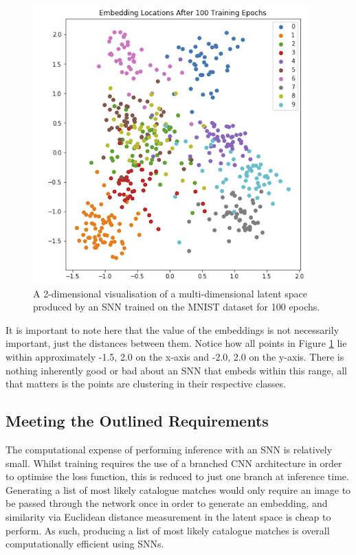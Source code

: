 \begin{figure}
	\begin{center}
		\includegraphics[scale=0.5]{Chapter6/figs/mnist-class-clusters-PCA.png}
	\end{center}
	\caption[A 2-dimensional visualisation of a multi-dimensional latent space produced by an SNN trained on the MNIST dataset for 100 epochs.]{A 2-dimensional visualisation of a multi-dimensional latent space produced by an SNN trained on the MNIST dataset \cite{lecun_gradient-based_1998} for 100 epochs.}
	\label{fig:mnist-class-clusters-PCA}
\end{figure}

It is important to note here that the value of the embeddings is not necessarily important, just the distances between them. Notice how all points in Figure \ref{fig:mnist-class-clusters-PCA} lie within approximately -1.5, 2.0 on the x-axis and -2.0, 2.0 on the y-axis. There is nothing inherently good or bad about an SNN that embeds within this range, all that matters is the points are clustering in their respective classes.

\subsection{Meeting the Outlined Requirements}\label{ch:ID,sec:deciding,sub:SNN,subsub:meetingOutlinedRequirements}

The computational expense of performing inference with an SNN is relatively small. Whilst training requires the use of a branched CNN architecture in order to optimise the loss function, this is reduced to just one branch at inference time. Generating a list of most likely catalogue matches would only require an image to be passed through the network once in order to generate an embedding, and similarity via Euclidean distance measurement in the latent space is cheap to perform. As such, producing a list of most likely catalogue matches is overall computationally efficient using SNNs. 

